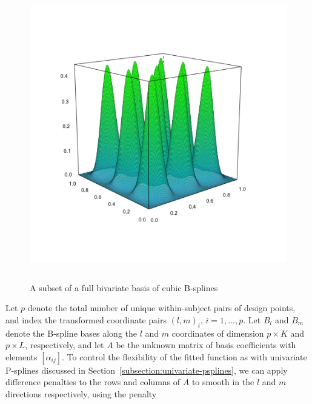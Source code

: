 \documentclass[12pt]{article}
\theoremstyle{definition}
\begin{document}
\begin{figure}[H]
  \centering
  \graphicspath{{img/}}
  \includegraphics[width=5in,height=5in]{sparse_bicubic_basis.png}
  \caption{A subset of a full bivariate basis of cubic B-splines}\label{fig:sparse_bicubic_BS_basis}
\end{figure}



Let $p$ denote the total number of unique within-subject pairs of design points, and index the transformed coordinate pairs $\left( l,m \right)_i$, $i=1, \dots,p$. Let $B_l$ and $B_m$ denote the B-spline bases along the $l$ and $m$ coordinates of dimension $p \times K$ and $p \times L$, respectively, and let $A$ be the unknown matrix of basis coefficients with elements $\left[ \alpha_{ij} \right]$. To control the flexibility of the fitted function as with univariate P-splines discussed in Section~\ref{subsection:univariate-psplines}, we can apply difference penalties to the rows and columns of $A$ to smooth in the $l$ and $m$ directions respectively, using the penalty 
\end{document}
